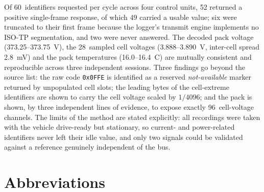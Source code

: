 \documentclass[11pt,a4paper,oneside,parskip=half]{scrreprt}
\begin{document}
Of 60~identifiers requested per cycle across four control units, 52 returned a positive single-frame
response, of which 49 carried a usable value; six were truncated to their first frame because the
logger's transmit engine implements no ISO-TP segmentation, and two were never answered. The decoded
pack voltage (373.25--373.75~V), the 28~sampled cell voltages (3.888--3.890~V, inter-cell spread
2.8~mV) and the pack temperatures (16.0--16.4~\textdegree C) are mutually consistent and reproducible
across three independent sessions. Three findings go beyond the source list: the raw code
\texttt{0x0FFE} is identified as a reserved \emph{not-available} marker returned by unpopulated cell
slots; the leading bytes of the cell-extreme identifiers are shown to carry the cell voltage scaled by
$1/4096$; and the pack is shown, by three independent lines of evidence, to expose exactly
96~cell-voltage channels. The limits of the method are stated explicitly: all recordings were taken
with the vehicle drive-ready but stationary, so current- and power-related identifiers never left
their idle value, and only two signals could be validated against a reference genuinely independent of
the bus.

\tableofcontents
{}

\listoffigures
{}

\chapter*{Abbreviations}
\end{document}

